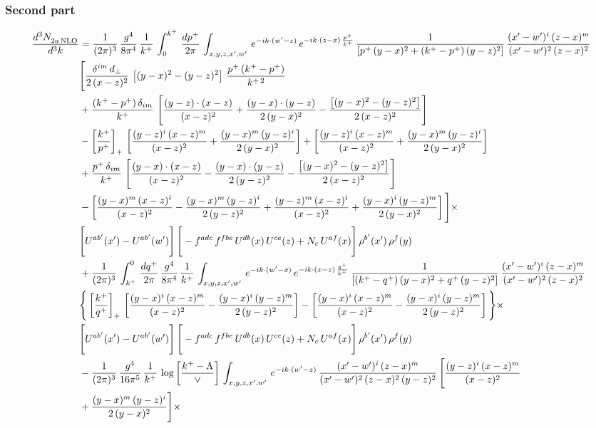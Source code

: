 \documentclass[9pt]{article}
\numberwithin{equation}{section}
\begin{document}
\subsubsection*{Second part}
\begin{align}
    \frac{d^{3}N_{2a\,\rm NLO}^{\rm}}{d^{3}k}  & =  \frac{1}{(2\pi)^{3}}\, \frac{g^{4}}{8\pi^{4}}\,\frac{1}{k^{+}}\,\int_{0}^{k^{+}}\, \frac{dp^{+}}{2\pi}\,\int_{x,y,z,x',w'}\,e^{-ik\cdot(w'-z)}\,e^{-ik\cdot (z-x)\,\frac{p^{+}}{k^{+}}}\,\frac{1}{\left[p^{+}\,(y-x)^{2}+(k^{+}-p^{+})\,(y-z)^{2}\right]}\, \frac{(x'-w')^{i}\,(z-x)^{m}}{(x'-w')^{2}\,(z-x)^{2}} \notag \\ & \Bigg[\frac{\delta^{im}\,d_{\perp}}{2\,(x-z)^{2}}\,\left[(y-x)^{2}-(y-z)^{2}\right]\,\frac{p^{+}\,(k^{+}-p^{+})}{k^{+\,2}}\notag \\ & +\frac{(k^{+}-p^{+})\,\delta_{im}}{k^{+}}\,\left[\frac{(y-z)\cdot (x-z)}{(x-z)^{2}}+\frac{(y-x)\cdot (y-z)}{2\,(y-x)^{2}}-\frac{\left[(y-x)^{2}-(y-z)^{2}\right]}{2\,(x-z)^{2}}\right]\notag \\ & -\left[\frac{k^{+}}{p^{+}}\right]_{+}\,\left[\frac{(y-z)^{i}\,(x-z)^{m}}{(x-z)^{2}}+\frac{(y-x)^{m}\,(y-z)^{i}}{2\,(y-x)^{2}}\right]+ \left[\frac{(y-z)^{i}\,(x-z)^{m}}{(x-z)^{2}}+\frac{(y-x)^{m}\,(y-z)^{i}}{2\,(y-x)^{2}}\right]\notag \\ & +\frac{p^{+}\,\delta_{im}}{k^{+}}\,\left[\frac{(y-x)\cdot (x-z)}{(x-z)^{2}}-\frac{(y-x)\cdot (y-z)}{2\,(y-z)^{2}}-\frac{\left[(y-x)^{2}-(y-z)^{2}\right]}{2\,(x-z)^{2}}\right]\notag \\ &-\left[\frac{(y-x)^{m}\,(x-z)^{i}}{(x-z)^{2}}-\frac{(y-x)^{m}\,(y-z)^{i}}{2\,(y-z)^{2}}+\frac{(y-z)^{m}\,(x-z)^{i}}{(x-z)^{2}}+\frac{(y-x)^{i}\,(y-z)^{m}}{2\,(y-x)^{2}}\right]\Bigg]\times \notag \\ & \Bigg[U^{ab'}(x')-U^{ab'}(w')\Bigg]\,\Bigg[-f^{adc}\,f^{fbe}\,U^{db}(x)\,U^{ce}(z)+N_{c}\,U^{af}(x)\Bigg]\,\rho^{b'}(x')\,\rho^{f}(y)\notag \\ & + \frac{1}{(2\pi)^{3}}\,\int^{0}_{k^{+}}\, \frac{dq^{+}}{2\pi} \,\frac{g^{4}}{8\pi^{4}}\,\frac{1}{k^{+}}\, \int_{x,y,z,x',w'}\,e^{-ik\cdot(w'-x)}\,e^{-ik\cdot (x-z)\,\frac{q^{+}}{k^{+}}}\, \frac{1}{\left[(k^{+}-q^{+})\,(y-x)^{2}+q^{+}\,(y-z)^{2}\right]}\, \frac{(x'-w')^{i}\,(z-x)^{m}}{(x'-w')^{2}\,(z-x)^{2}} \notag \\ &\Bigg\{\left[\frac{k^{+}}{q^{+}}\right]_{+}\,\left[\frac{(y-x)^{i}\,(x-z)^{m}}{(x-z)^{2}}-\frac{(y-x)^{i}\,(y-z)^{m}}{2\,(y-z)^{2}}\right] -\left[\frac{(y-x)^{i}\,(x-z)^{m}}{(x-z)^{2}}-\frac{(y-x)^{i}\,(y-z)^{m}}{2\,(y-z)^{2}}\right]\Bigg\}\times\,\notag \\ & \Bigg[U^{ab'}(x')-U^{ab'}(w')\Bigg]\,\Bigg[-f^{adc}\,f^{fbe}\,U^{db}(x)\,U^{ce}(z)+N_{c}\,U^{af}(x)\Bigg]\,\rho^{b'}(x')\,\rho^{f}(y)\notag \\ & - \frac{1}{(2\pi)^{3}}\, \frac{g^{4}}{16\pi^{5}}\,\frac{1}{k^{+}}\,\log{\left[\frac{k^{+}-\Lambda}{\vee}\right]}\, \int_{x,y,z,x',w'}\, e^{-ik\cdot(w'-z)}\,\frac{(x'-w')^{i}\,(z-x)^{m}}{(x'-w')^{2}\,(z-x)^{2}\, (y-z)^{2}}\,\Bigg[\frac{(y-z)^{i}\,(x-z)^{m}}{(x-z)^{2}}\notag \\ & +\frac{(y-x)^{m}\,(y-z)^{i}}{2\,(y-x)^{2}}\Bigg]\times\, 
\end{align}
\end{document}
